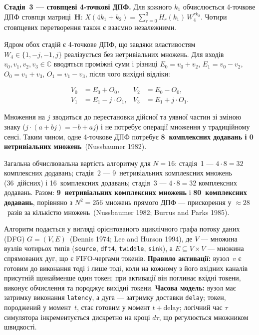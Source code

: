 \textbf{Стадія~3 --- стовпцеві 4-точкові ДПФ.} Для кожного \(k_{1}\)
обчислюється 4-точкове ДПФ стовпця матриці~\(\mathbf{H}\):
\(X(4k_{1}+k_{2})=\sum_{r=0}^{3}H_{r}(k_{1})\,W_{4}^{rk_{2}}\).
Чотири стовпцевих перетворення також є взаємно незалежними.

Ядром обох стадій є 4-точкове ДПФ, що завдяки властивостям
\(W_{4}\in\{1,-j,-1,j\}\) реалізується без нетривіальних множень. Для
входів \(v_{0},v_{1},v_{2},v_{3}\in\mathbb{C}\) вводяться проміжні
суми і різниці \(E_{0}=v_{0}+v_{2}\), \(E_{1}=v_{0}-v_{2}\),
\(O_{0}=v_{1}+v_{3}\), \(O_{1}=v_{1}-v_{3}\), після чого вихідні
відліки:

\[\begin{aligned}
V_{0} &= E_{0}+O_{0}, & V_{2} &= E_{0}-O_{0}, \\
V_{1} &= E_{1}-j\cdot O_{1}, & V_{3} &= E_{1}+j\cdot O_{1}.
\end{aligned}\]

Множення на \(j\) зводиться до перестановки дійсної та уявної частин зі
зміною знаку (\(j\cdot(a+bj)=-b+aj\)) і не потребує операції множення у
традиційному сенсі. Таким чином, одне 4-точкове ДПФ потребує
\textbf{8~комплексних додавань і 0 нетривіальних множень}~(Nussbaumer 1982).

Загальна обчислювальна вартість алгоритму для \(N=16\): стадія~1 ---
\(4\cdot8=32\) комплексних додавань; стадія~2 --- 9~нетривіальних
комплексних множень (36~дійсних) і 16~комплексних додавань; стадія~3 ---
\(4\cdot8=32\) комплексних додавань. Разом: \textbf{9~нетривіальних
комплексних множень} і \textbf{80~комплексних додавань}, порівняно з
\(N^{2}=256\) множень прямого ДПФ --- прискорення у \(\approx28\)~разів
за кількістю множень~(Nussbaumer 1982; Burrus and Parks 1985).

Алгоритм подається у вигляді орієнтованого ациклічного графа потоку
даних (DFG) \(G=(V,E)\)~(Dennis 1974; Lee and Hurson 1994), де \(V\)
--- множина вузлів чотирьох типів (\texttt{source}, \texttt{dft4},
\texttt{twiddle}, \texttt{sink}), а \(E\subseteq V\times V\) --- множина
спрямованих дуг, що є FIFO-чергами токенів. \textbf{Правило
активації:} вузол~\(v\) є готовим до виконання тоді і лише тоді, коли
на кожному з його вхідних каналів присутній щонайменше один токен; при
активації він поглинає вхідні токени, виконує обчислення та породжує
вихідні токени. \textbf{Часова модель:} вузол має затримку виконання
\texttt{latency}, а дуга --- затримку доставки \texttt{delay}; токен,
породжений у момент~\(t\), стає готовим у момент \(t+\text{delay}\);
логічний час \(\tau\) симулятора інкрементується дискретно на кроці
\(d\tau\), що регулюється множником швидкості.

